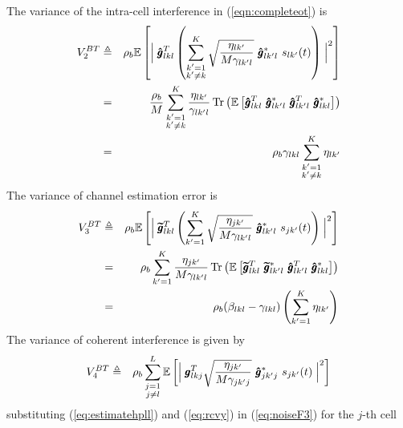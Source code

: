 \documentclass[10pt, a4paper, twoside,fleqn]{article}
\DeclareMathOperator{\Tr}{Tr}
\begin{document}
The variance of the intra-cell interference in (\ref{eqn:completeot})  is
\begin{eqnarray}\label{eq:noiseF2}
	V_2^{BT} &\triangleq& \rho_b \mathbb{E}\left[\Bigm| \pmb{\hat g}^T_{lkl}  \left(\sum_{\substack{k'=1 \\ k' \neq k}}^{K} \sqrt{\frac{\eta_{lk'}}{M\gamma_{lk'l}}} \ \pmb{\hat g}^*_{lk'l} \ s_{lk'} (t)\right)\Bigm|^2\right] \nonumber \\
        &=& \frac{\rho_b}{M} \sum_{\substack{k'=1 \\ k' \neq k}}^{K}\frac{\eta_{lk'}}{\gamma_{lk'l}} \Tr\left(\mathbb{E}\left[ \pmb{\hat g}^T_{lkl} \ \pmb{\hat g}_{lk'l}^* \ \pmb{\hat g}^T_{lk'l} \ \pmb{\hat g}_{lkl}^{*} \right]\right) \nonumber \\
	    &=&  \rho_b\gamma_{lkl}\sum\limits_{\substack{k'=1\\ k'\neq k}}^{K}\eta_{lk'}
\end{eqnarray}
The variance of channel estimation error is
\begin{eqnarray}\label{eqn:noiseF4}
	V_3^{BT} &\triangleq& \rho_b \mathbb{E} \left[ \Bigm | \pmb{\widetilde{g}}_{lkl}^T \left(\sum_{k'=1}^{K} \sqrt{\frac{\eta_{jk'}}{M\gamma_{lk'l}}} \ \pmb{\hat g}^*_{lk'l} \ s_{jk'} (t)\right)\Bigm|^2 \right] \nonumber \\
     &=& \rho_b\sum_{k'=1}^{K} \frac{\eta_{jk'}}{M\gamma_{lk'l}} \Tr\left(\mathbb{E}\left[\pmb{\widetilde{g}}^T_{lkl} \ \pmb{\widetilde{g}}_{lk'l}^* \ \pmb{\hat g}_{lk'l}^T \ \pmb{\hat g}_{lkl}^{*} \right]\right) \nonumber \\
        &=& \rho_b(\beta_{lkl}-\gamma_{lkl})\left(\sum\limits_{k'=1}^{K}\eta_{lk'}\right)
\end{eqnarray}
The variance of coherent interference is given by
\begin{eqnarray}\label{eq:noiseF3}
	V_4^{BT} &\triangleq& \rho_b \sum_{\substack{j=1 \\ j \neq l}}^{L}\mathbb{E}\left[\Bigm| \pmb{g}_{lkj}^T \sqrt{\frac{\eta_{jk'}}{M\gamma_{jk'j}}} \ \pmb{\hat g}^*_{jk'j} \ s_{jk'} (t)\Bigm|^2\right] 
\end{eqnarray}
substituting (\ref{eq:estimatehpll}) and (\ref{eq:rcvy}) in (\ref{eq:noiseF3}) for the $j$-th cell
\end{document}
